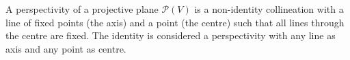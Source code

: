 A perspectivity of a projective plane $\mathcal{P}(V)$ is a non-identity collineation with a line of fixed points (the axis) and a point (the centre) such that all lines through the centre are fixed. The identity is considered a perspectivity with any line as axis and any point as centre.

